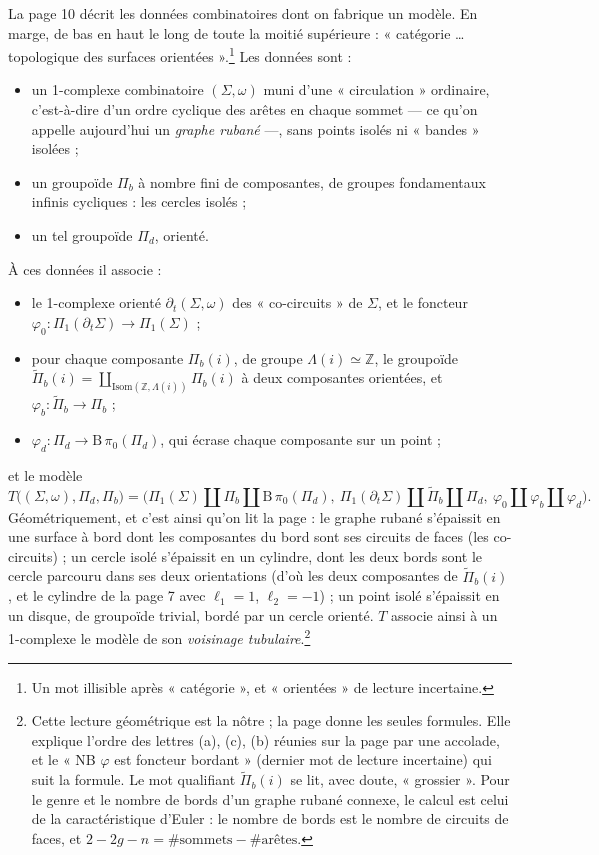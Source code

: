 \documentclass[11pt,a4paper]{article}
\begin{document}
La page 10 décrit les données combinatoires dont on fabrique un modèle. En
marge, de bas en haut le long de toute la moitié supérieure : « catégorie
\dots{} topologique des surfaces orientées ».\footnote{Un mot illisible après
« catégorie », et « orientées » de lecture incertaine.} Les données sont :
\begin{itemize}
\item[(a)] un 1-complexe combinatoire $(\Sigma, \omega)$ muni d'une
« circulation » ordinaire, c'est-à-dire d'un ordre cyclique des arêtes en
chaque sommet — ce qu'on appelle aujourd'hui un \emph{graphe rubané} —, sans
points isolés ni « bandes » isolées ;
\item[(b)] un groupoïde $\Pi_b$ à nombre fini de composantes, de groupes
fondamentaux infinis cycliques : les cercles isolés ;
\item[(c)] un tel groupoïde $\Pi_d$, orienté.
\end{itemize}
À ces données il associe :
\begin{itemize}
\item[(a$'$)] le 1-complexe orienté $\partial_t(\Sigma, \omega)$ des
« co-circuits » de $\Sigma$, et le foncteur $\varphi_0 :
\Pi_1(\partial_t\Sigma) \to \Pi_1(\Sigma)$ ;
\item[(b$'$)] pour chaque composante $\Pi_b(i)$, de groupe $\Lambda(i) \simeq
\mathbb{Z}$, le groupoïde $\widetilde{\Pi}_b(i) =
\coprod_{\mathrm{Isom}(\mathbb{Z}, \Lambda(i))} \Pi_b(i)$ à deux
composantes orientées, et $\varphi_b : \widetilde{\Pi}_b \to \Pi_b$ ;
\item[(c$'$)] $\varphi_d : \Pi_d \to \mathrm{B}\,\pi_0(\Pi_d)$, qui écrase
chaque composante sur un point ;
\end{itemize}
et le modèle
\[
  T\bigl((\Sigma, \omega), \Pi_d, \Pi_b\bigr) =
  \bigl(\Pi_1(\Sigma) \amalg \Pi_b \amalg \mathrm{B}\,\pi_0(\Pi_d),\
  \Pi_1(\partial_t\Sigma) \amalg \widetilde{\Pi}_b \amalg \Pi_d,\
  \varphi_0 \amalg \varphi_b \amalg \varphi_d\bigr) .
\]
Géométriquement, et c'est ainsi qu'on lit la page : le graphe rubané
s'épaissit en une surface à bord dont les composantes du bord sont ses
circuits de faces (les co-circuits) ; un cercle isolé s'épaissit en un
cylindre, dont les deux bords sont le cercle parcouru dans ses deux
orientations (d'où les deux composantes de $\widetilde{\Pi}_b(i)$, et le
cylindre de la page 7 avec $\ell_1 = 1$, $\ell_2 = -1$) ; un point isolé
s'épaissit en un disque, de groupoïde trivial, bordé par un cercle orienté.
$T$ associe ainsi à un 1-complexe le modèle de son \emph{voisinage
tubulaire}.\footnote{Cette lecture géométrique est la nôtre ; la page donne
les seules formules. Elle explique l'ordre des lettres (a), (c), (b) réunies
sur la page par une accolade, et le « NB $\varphi$ est foncteur bordant »
(dernier mot de lecture incertaine) qui suit la formule. Le mot qualifiant
$\widetilde{\Pi}_b(i)$ se lit, avec doute, « grossier ». Pour le genre et le
nombre de bords d'un graphe rubané connexe, le calcul est celui de la
caractéristique d'Euler : le nombre de bords est le nombre de circuits de
faces, et $2 - 2g - n = \#\text{sommets} - \#\text{arêtes}$.}
\end{document}
